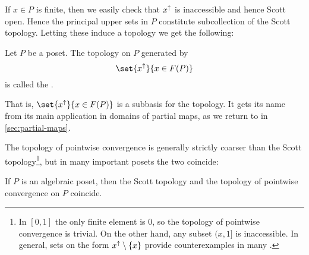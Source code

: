 

If $x \in P$ is finite, then we easily check that $\upset{x}$ is inaccessible and hence Scott open. Hence the principal upper sets in $P$ constitute subcollection of the Scott topology. Letting these induce a topology we get the following:

\begin{definition}
    Let $P$ be a poset. The topology on $P$ generated by
    \begin{equation*}
        \set{x^\uparrow}{x \in \finite{P}}
    \end{equation*}
    is called the .
\end{definition}
%
That is, $\set{x^\uparrow}{x \in \finite{P}}$ is a subbasis for the topology. It gets its name from its main application in domains of partial maps, as we return to in \cref{sec:partial-maps}.

The topology of pointwise convergence is generally strictly coarser than the Scott topology\footnote{In $[0,1]$ the only finite element is $0$, so the topology of pointwise convergence is trivial. On the other hand, any subset $(x,1]$ is inaccessible. In general, sets on the form $\upset{x} \setminus \{x\}$ provide counterexamples in many \dCPOpl.}, but in many important posets the two coincide:

\begin{proposition}
    \label{prop:Scott-topology-pointwise-equal}
    If $P$ is an algebraic poset, then the Scott topology and the topology of pointwise convergence on $P$ coincide.
\end{proposition}


